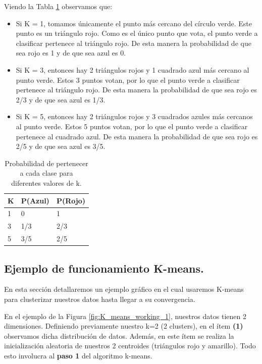 \documentclass[12pt,a4paper]{article}
\begin{document}
\begin{sloppypar}
Viendo la Tabla \ref{table:2} observamos que:

\begin{itemize}
\item Si K = 1, tomamos únicamente el punto más cercano del círculo verde. Este punto es un triángulo rojo. Como es el único punto que vota, el punto verde a clasificar pertenece al triángulo rojo. De esta manera la probabilidad de que sea rojo es 1 y de que sea azul es 0.
\item Si K = 3, entonces hay 2 triángulos rojos y 1 cuadrado azul más cercano al punto verde. Estos 3 puntos votan, por lo que el punto verde a clasificar pertenece al triángulo rojo. De esta manera la probabilidad de que sea rojo es 2/3 y de que sea azul es 1/3.
\item Si K = 5, entonces hay 2 triángulos rojos y 3 cuadrados azules más cercanos al punto verde. Estos 5 puntos votan, por lo que el punto verde a clasificar pertenece al cuadrado azul. De esta manera la probabilidad de que sea rojo es 2/5 y de que sea azul es 3/5.
\end{itemize}

\begin{table}[h!]
\centering
\begin{tabular}{|p{2cm}|p{2cm}|p{2cm}|}
\hline
\textbf{K} & \textbf{P(Azul)} & \textbf{P(Rojo)} \\ [1ex] 
\hline
1 & 0 & 1 \\
\hline
3 & 1/3 & 2/3 \\
\hline
5 & 3/5 & 2/5 \\
\hline
\end{tabular}
\caption{Probabilidad de pertenecer a cada clase para diferentes valores de k.}
\label{table:2}
\end{table}

\cleardoublepage

\subsection{Ejemplo de funcionamiento K-means.}\label{anexo_k_means}

En esta sección detallaremos un ejemplo gráfico en el cual usaremos K-means para clusterizar nuestros datos hasta llegar a su convergencia. 

En el ejemplo de la Figura \ref{fig:K_means_working_1}, nuestros datos tienen 2 dimensiones. Definiendo previamente nuestro k=2 (2 clusters), en el ítem \textbf{(1)} observamos dicha distribución de datos. Además, en este ítem se realiza la inicialización aleatoria de nuestros 2 centroides (triángulos rojo y amarillo). Todo esto involucra al \textbf{paso 1} del algoritmo k-means.  


\end{sloppypar}
\end{document}
